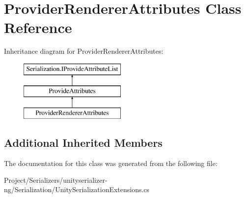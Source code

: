 \hypertarget{class_provider_renderer_attributes}{}\section{Provider\+Renderer\+Attributes Class Reference}
\label{class_provider_renderer_attributes}
Inheritance diagram for Provider\+Renderer\+Attributes\+:\begin{figure}[H]
\begin{center}
\leavevmode
\includegraphics[height=3.000000cm]{class_provider_renderer_attributes}
\end{center}
\end{figure}
\subsection*{Additional Inherited Members}


The documentation for this class was generated from the following file\+:\begin{DoxyCompactItemize}
\item 
Project/\+Serializers/unityserializer-\/ng/\+Serialization/Unity\+Serialization\+Extensions.\+cs\end{DoxyCompactItemize}
